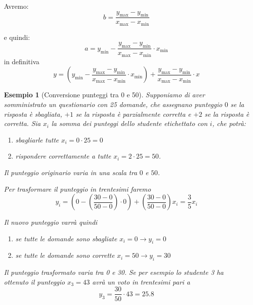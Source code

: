 \documentclass[
  11pt,
]{book}
\providecommand{\tightlist}{%
  \setlength{\itemsep}{0pt}\setlength{\parskip}{0pt}}
\theoremstyle{mytheoremstyle}
\theoremstyle{mydefstyle}
\newtheorem{example}{{Esempio}}[section]
\begin{document}
Avremo:
\[
b = \frac{y_{\text{max}} - y_{\text{min}}}{x_{\text{max}} - x_{\text{min}}}
\]

e quindi:
\[
a = y_{\text{min}} - \frac{y_{\text{max}} - y_{\text{min}}}{x_{\text{max}} - x_{\text{min}}} \cdot x_{\text{min}}
\]
in definitiva
\[
y = \left( y_{\text{min}} - \frac{y_{\text{max}} - y_{\text{min}}}{x_{\text{max}} - x_{\text{min}}} \cdot x_{\text{min}} \right) + \frac{y_{\text{max}} - y_{\text{min}}}{x_{\text{max}} - x_{\text{min}}} \cdot x
\]

\begin{example}[Conversione punteggi tra 0 e 50]
Supponiamo di aver somministrato un questionario con 25 domande, che assegnano punteggio \(0\) se la risposta è sbagliata,
\(+1\) se la risposta è parzialmente corretta e \(+2\) se la risposta è corretta. Sia \(x_i\) la somma dei punteggi dello studente etichettato con \(i\), che potrà:

\begin{enumerate}
\def\labelenumi{\arabic{enumi}.}
\tightlist
\item
  sbagliarle tutte \(x_i=0\cdot 25 =0\)
\item
  rispondere correttamente a tutte \(x_i=2\cdot 25 =50\).
\end{enumerate}

Il punteggio originario varia in una scala tra \(0\) e \(50\).

Per trasformare il punteggio in trentesimi faremo
\[
y_i = \left(0 - \left(\frac{30-0}{50-0}\right)\cdot 0\right)+\left(\frac{30-0}{50-0}\right) x_i=\frac 35x_i
\]

Il nuovo punteggio varrà quindi

\begin{enumerate}
\def\labelenumi{\arabic{enumi}.}
\tightlist
\item
  se tutte le domande sono sbagliate \(x_i = 0 \rightarrow y_i = 0\)
\item
  se tutte le domande sono corrette \(x_i = 50 \rightarrow y_i = 30\)
\end{enumerate}

Il punteggio trasformato varia tra 0 e 30. Se per esempio lo studente 3 ha ottenuto il punteggio \(x_3=43\) avrà un voto in trentesimi pari a
\[
y_3=\frac{30}{50}\cdot43=25.8
\]
\end{example}
\end{document}
